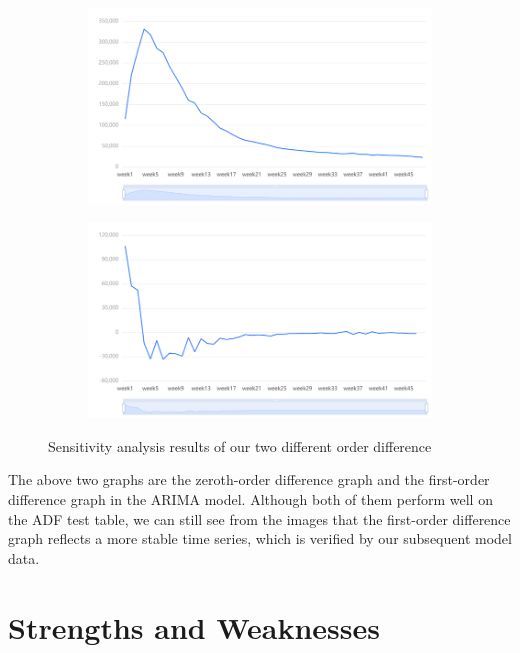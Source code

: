 \documentclass[12pt]{article}  %
\begin{document}
\begin{figure}[htbp]
\centering
\begin{subfigure}[b]{.4\textwidth}
\includegraphics[width=\textwidth]{img/sensity1.png}
\end{subfigure}
\begin{subfigure}[b]{.4\textwidth}
\includegraphics[width=\textwidth]{img/sensity2.png}
\end{subfigure}
\caption{Sensitivity analysis results of our two different order difference}\label{fig:subfigures}
\end{figure}

The above two graphs are the zeroth-order difference graph and the first-order difference graph in the ARIMA model. Although both of them perform well on the ADF test table, we can still see from the images that the first-order difference graph reflects a more stable time series, which is verified by our subsequent model data.

\section{Strengths and Weaknesses}
\end{document}
